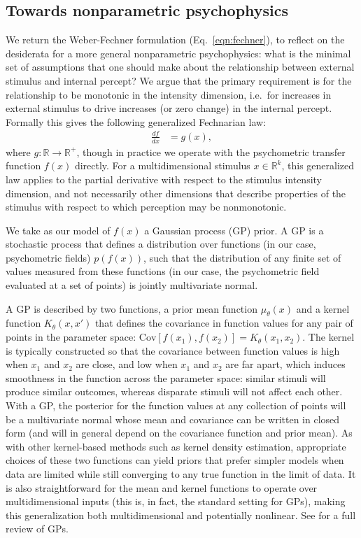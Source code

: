 \documentclass[../main.tex]{subfiles}
\begin{document}
\subsection{Towards nonparametric psychophysics}

We return the Weber-Fechner formulation (Eq.~\ref{eqn:fechner}), to reflect on the desiderata for a more general nonparametric psychophysics: what is the minimal set of assumptions that one should make about the relationship between external stimulus and internal percept? We argue that the primary requirement is for the relationship to be monotonic in the intensity dimension, i.e.\ for increases in external stimulus to drive increases (or zero change) in the internal percept. Formally this gives the following generalized Fechnarian law:
\begin{align}
\frac{df}{dx} &= g(x),
\end{align}
where $g: \mathbb{R} \rightarrow \mathbb{R}^+$, though in practice we operate with the psychometric transfer function
$f(x)$ directly.
For a multidimensional stimulus $x \in \mathbb{R}^k$, this generalized law applies to the partial derivative with respect to the stimulus intensity dimension, and not necessarily other dimensions that describe properties of the stimulus with respect to which perception may be nonmonotonic.

We take as our model of $f(x)$ a Gaussian process (GP) prior. A GP is a stochastic process that defines a distribution over functions (in our case, psychometric fields) $p(f(x))$, such that the distribution of any finite set of values measured from these functions (in our case, the psychometric field evaluated at a set of points) is jointly multivariate normal.

A GP is described by two functions, a prior mean function $\mu_{\theta}(x)$ and a kernel function $K_{\theta}(x, x')$ that defines the covariance in function values for any pair of points in the parameter space: $\textrm{Cov}[f(x_1), f(x_2)] = K_{\theta}(x_1, x_2)$. The kernel is typically constructed so that the covariance between function values is high when $x_1$ and $x_2$ are close, and low when $x_1$ and $x_2$ are far apart, which induces smoothness in the function across the parameter space: similar stimuli will produce similar outcomes, whereas disparate stimuli will not affect each other. With a GP, the posterior for the function values at any collection of points will be a multivariate normal whose mean and covariance can be written in closed form (and will in general depend on the covariance function and prior mean). As with other kernel-based methods such as kernel density estimation, appropriate choices of these two functions can yield priors that prefer simpler models when data are limited while still converging to any true function in the limit of data. It is also straightforward for the mean and kernel functions to operate over multidimensional inputs (this is, in fact, the standard setting for GPs), making this generalization both multidimensional and potentially nonlinear. See \citet{rasmussen2006gaussian} for a full review of GPs.
\end{document}
